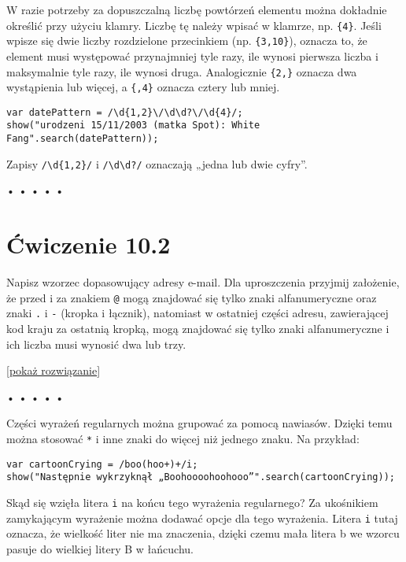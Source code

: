 W razie potrzeby za dopuszczalną liczbę powtórzeń elementu można dokładnie określić przy użyciu klamry. Liczbę tę należy wpisać w klamrze, np. \texttt{\{4\}}. Jeśli wpisze się dwie liczby rozdzielone przecinkiem (np. \texttt{\{3,10\}}), oznacza to, że element musi występować przynajmniej tyle razy, ile wynosi pierwsza liczba i maksymalnie tyle razy, ile wynosi druga. Analogicznie \texttt{\{2,\}} oznacza dwa wystąpienia lub więcej, a \texttt{\{,4\}} oznacza cztery lub mniej.

  
\begin{verbatim} 
var datePattern = /\d{1,2}\/\d\d?\/\d{4}/;
show("urodzeni 15/11/2003 (matka Spot): White Fang".search(datePattern));
 \end{verbatim}
  
Zapisy \texttt{/\textbackslash d\{1,2\}/} i \texttt{/\textbackslash d\textbackslash d?/} oznaczają „jedna lub dwie cyfry”.



\begin{center}
• • • • •
\end{center}

  
\section*{Ćwiczenie 10.2}
\label{sec:10.2}
  
    
Napisz wzorzec dopasowujący adresy e-mail. Dla uproszczenia przyjmij założenie, że przed i za znakiem \texttt{@} mogą znajdować się tylko znaki alfanumeryczne oraz znaki \texttt{.} i \texttt{-} (kropka i łącznik), natomiast w ostatniej części adresu, zawierającej kod kraju za ostatnią kropką, mogą znajdować się tylko znaki alfanumeryczne i ich liczba musi wynosić dwa lub trzy.

  
[\hyperref[sol:10.2]{pokaż rozwiązanie}]
  


\begin{center}
• • • • •
\end{center}

  
Części wyrażeń regularnych można grupować za pomocą nawiasów. Dzięki temu można stosować \texttt{*} i inne znaki do więcej niż jednego znaku. Na przykład:

  
\begin{verbatim} 
var cartoonCrying = /boo(hoo+)+/i;
show("Następnie wykrzyknął „Boohoooohoohooo”".search(cartoonCrying));
 \end{verbatim}
  
Skąd się wzięła litera \texttt{i} na końcu tego wyrażenia regularnego? Za ukośnikiem zamykającym wyrażenie można dodawać opcje dla tego wyrażenia. Litera \texttt{i} tutaj oznacza, że wielkość liter nie ma znaczenia, dzięki czemu mała litera b we wzorcu pasuje do wielkiej litery B w łańcuchu.

